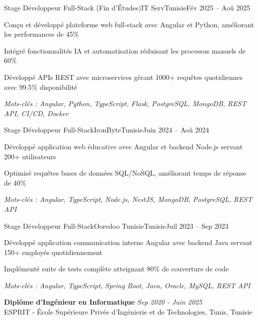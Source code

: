 \documentclass[11pt,a4paper]{article}
\begin{document}
\makecvheader
\makecontactinfo


\begin{internship}{Stage Développeur Full-Stack (Fin d'Études)}{IT Serv}{Tunisie}{Fév 2025 -- Aoû 2025}{}
  \item Conçu et développé plateforme web full-stack avec Angular et Python, améliorant les performances de 45\%
  \item Intégré fonctionnalités IA et automatisation réduisant les processus manuels de 60\%
  \item Développé APIs REST avec microservices gérant 1000+ requêtes quotidiennes avec 99.5\% disponibilité
  \item[] \textit{\footnotesize Mots-clés : Angular, Python, TypeScript, Flask, PostgreSQL, MongoDB, REST API, CI/CD, Docker}
\end{internship}

\begin{internship}{Stage Développeur Full-Stack}{IronByte}{Tunisie}{Juin 2024 -- Aoû 2024}{}
  \item Développé application web éducative avec Angular et backend Node.js servant 200+ utilisateurs
  \item Optimisé requêtes bases de données SQL/NoSQL, améliorant temps de réponse de 40\%
  \item[] \textit{\footnotesize Mots-clés : Angular, TypeScript, Node.js, NestJS, MongoDB, PostgreSQL, REST API}
\end{internship}

\begin{internship}{Stage Développeur Full-Stack}{Ooredoo Tunisie}{Tunisie}{Juil 2023 -- Sep 2023}{}
  \item Développé application communication interne Angular avec backend Java servant 150+ employés quotidiennement
  \item Implémenté suite de tests complète atteignant 80\% de couverture de code
  \item[] \textit{\footnotesize Mots-clés : Angular, TypeScript, Spring Boot, Java, Oracle, MySQL, REST API}
\end{internship}

\textbf{Diplôme d'Ingénieur en Informatique} \hfill \textit{Sep 2020 - Juin 2025}\\[-2pt]
ESPRIT - École Supérieure Privée d'Ingénierie et de Technologies, Tunis, Tunisie
\end{document}
